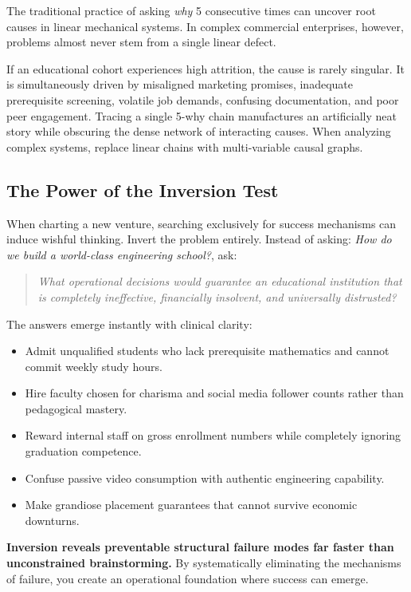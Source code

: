 The traditional practice of asking \textit{why} 5 consecutive times can uncover root causes in linear mechanical systems. In complex commercial enterprises, however, problems almost never stem from a single linear defect.

If an educational cohort experiences high attrition, the cause is rarely singular. It is simultaneously driven by misaligned marketing promises, inadequate prerequisite screening, volatile job demands, confusing documentation, and poor peer engagement. Tracing a single 5-why chain manufactures an artificially neat story while obscuring the dense network of interacting causes. When analyzing complex systems, replace linear chains with multi-variable causal graphs.

\subsection{The Power of the Inversion Test}

When charting a new venture, searching exclusively for success mechanisms can induce wishful thinking. Invert the problem entirely. Instead of asking: \textit{How do we build a world-class engineering school?}, ask:

\begin{quote}
\itshape
What operational decisions would guarantee an educational institution that is completely ineffective, financially insolvent, and universally distrusted?
\end{quote}

The answers emerge instantly with clinical clarity:
\begin{itemize}[leftmargin=10pt,itemsep=1pt,topsep=1pt]
  \item Admit unqualified students who lack prerequisite mathematics and cannot commit weekly study hours.
  \item Hire faculty chosen for charisma and social media follower counts rather than pedagogical mastery.
  \item Reward internal staff on gross enrollment numbers while completely ignoring graduation competence.
  \item Confuse passive video consumption with authentic engineering capability.
  \item Make grandiose placement guarantees that cannot survive economic downturns.
\end{itemize}

\textbf{Inversion reveals preventable structural failure modes far faster than unconstrained brainstorming.} By systematically eliminating the mechanisms of failure, you create an operational foundation where success can emerge.
